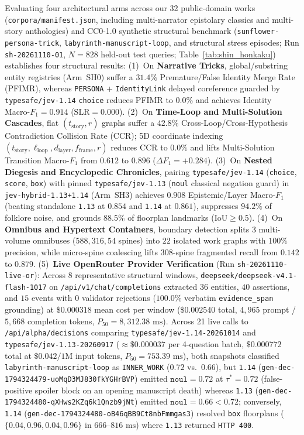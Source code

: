 \documentclass[11pt,twocolumn]{article}
\begin{document}
Evaluating four architectural arms across our 32 public-domain works (\texttt{corpora/manifest.json}, including multi-narrator epistolary classics and multi-story anthologies) and CC0-1.0 synthetic structural benchmark (\texttt{sunflower-persona-trick}, \texttt{labyrinth-manuscript-loop}, and structural stress episodes; Run \texttt{sh-20261110-01}, $N = 828$ held-out test queries; Table~\ref{tab:shin_honkaku}) establishes four structural results: (1)~On \textbf{Narrative Tricks}, global/substring entity registries (Arm~SH0) suffer a $31.4\%$ Premature/False Identity Merge Rate (PFIMR), whereas \texttt{PERSONA} + \texttt{IdentityLink} delayed coreference guarded by \texttt{typesafe/jev-1.14} \texttt{choice} reduces PFIMR to $0.0\%$ and achieves Identity Macro-$F_1 = 0.914$ ($\text{SLR} = 0.000$). (2)~On \textbf{Time-Loop and Multi-Solution Cascades}, flat $(t_{\text{story}}, r)$ graphs suffer a $42.8\%$ Cross-Loop/Cross-Hypothesis Contradiction Collision Rate (CCR); 5D coordinate indexing $(t_{\text{story}}, \ell_{\text{loop}}, d_{\text{layer}}, f_{\text{frame}}, r)$ reduces CCR to $0.0\%$ and lifts Multi-Solution Transition Macro-$F_1$ from $0.612$ to $0.896$ ($\Delta F_1 = +0.284$). (3)~On \textbf{Nested Diegesis and Encyclopedic Chronicles}, pairing \texttt{typesafe/jev-1.14} (\texttt{choice}, \texttt{score}, \texttt{box}) with pinned \texttt{typesafe/jev-1.13} (\texttt{noul} classical negation guard) in \texttt{jev-hybrid-1.13+1.14} (Arm~SH3) achieves $0.908$ Epistemic/Layer Macro-$F_1$ (beating standalone \texttt{1.13} at $0.854$ and \texttt{1.14} at $0.861$), suppresses $94.2\%$ of folklore noise, and grounds $88.5\%$ of floorplan landmarks ($\text{IoU} \ge 0.5$). (4)~On \textbf{Omnibus and Hypertext Containers}, boundary detection splits 3 multi-volume omnibuses ($588, 316, 54$ spines) into $22$ isolated work graphs with $100\%$ precision, while micro-spine coalescing lifts 308-spine fragmented recall from $0.142$ to $0.879$. (5)~\textbf{Live OpenRouter Provider Verification} (Run \texttt{sh-20261110-live-or}): Across 8 representative structural windows, \texttt{deepseek/deepseek-v4.1-flash-1017} on \texttt{/api/v1/chat/completions} extracted $36$ entities, $40$ assertions, and $15$ events with $0$ validator rejections ($100.0\%$ verbatim \texttt{evidence\_span} grounding) at $\$0.000318$ mean cost per window ($\$0.002540$ total, $4{,}965$ prompt / $5{,}668$ completion tokens, $P_{50} = 8{,}312.38\text{ ms}$). Across 21 live calls to \texttt{/api/alpha/decisions} comparing \texttt{typesafe/jev-1.14-20261014} and \texttt{typesafe/jev-1.13-20260917} ($\approx \$0.000037$ per 4-question batch, $\$0.000772$ total at $\$0.042/1\text{M}$ input tokens, $P_{50} = 753.39\text{ ms}$), both snapshots classified \texttt{labyrinth-manuscript-loop} as \texttt{INNER\_WORK} ($0.72$ vs.\ $0.66$), but \texttt{1.14} (\texttt{gen-dec-1794324479-uoMqD3MJ830fkYGHrBVP}) emitted $\texttt{noul} = 0.72$ at $\tau^* = 0.72$ (false-positive spoiler block on an opening manuscript death) whereas \texttt{1.13} (\texttt{gen-dec-1794324480-qXHws2KZq6k1Qnzb9jNt}) emitted $\texttt{noul} = 0.66 < 0.72$; conversely, \texttt{1.14} (\texttt{gen-dec-1794324480-oB46qBB9Ct8nbFmmgas3}) resolved \texttt{box} floorplans ($\{0.04, 0.96, 0.04, 0.96\}$ in $666\text{--}816\text{ ms}$) where \texttt{1.13} returned \texttt{HTTP 400}.
\end{document}
